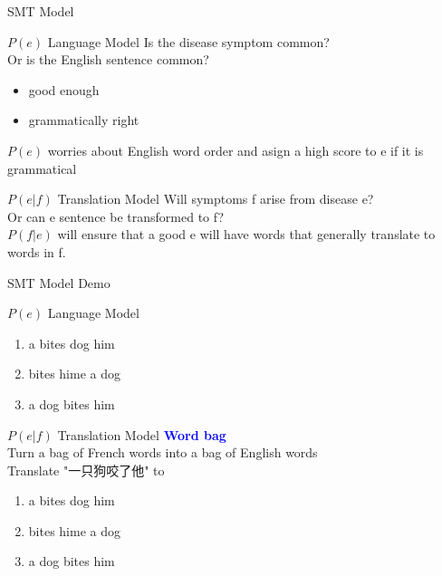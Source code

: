 \documentclass{beamer}
\begin{document}
\begin{frame}{SMT Model}
    \begin{block}{$P(e)$ Language Model}
        Is the disease symptom common?\\
        Or is the English sentence common?
        \begin{itemize}
            \item good enough
            \item grammatically right
        \end{itemize}
        \pause
        $P(e)$ worries about English word order and asign a high score to e if it is grammatical
    \end{block}
    \pause
    \begin{block}{$P(e|f)$ Translation Model}
        Will symptoms f arise from disease e?\\
        Or can e sentence be transformed to f?\\
        \pause
        $P(f|e)$ will ensure that a good e will have words that generally translate to words in f.
    \end{block}
\end{frame}

\begin{frame}{SMT Model Demo}
    \begin{block}{$P(e)$ Language Model}
        \begin{enumerate}
            \item a bites dog him
            \item bites hime a dog
            \item a dog bites him
        \end{enumerate}
    \end{block}
    \pause
    \begin{block}{$P(e|f)$ Translation Model}
        \textcolor{blue}{\textbf{Word bag}} \\
        Turn a bag of French words into a bag of English words\\
        Translate "一只狗咬了他" to 
        \begin{enumerate}
            \item a bites dog him
            \item bites hime a dog
            \item a dog bites him
        \end{enumerate}
    \end{block}
\end{frame}
\end{document}
